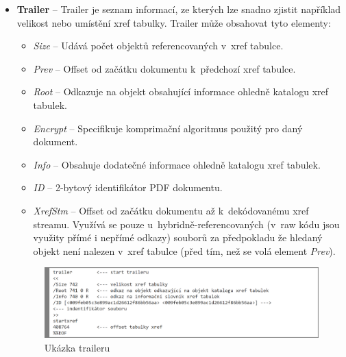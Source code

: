 \begin{itemize}
	\item \textbf{Trailer} --  Trailer je seznam informací, ze kterých lze snadno zjistit například velikost nebo umístění xref tabulky. Trailer může obsahovat tyto elementy:
	\begin{itemize}
		\item \textit{Size} -- Udává počet objektů referencovaných v~xref tabulce. 
		\item \textit{Prev} -- Offset od začátku dokumentu k~předchozí xref tabulce.
		\item \textit{Root} -- Odkazuje na objekt obsahující informace ohledně katalogu xref tabulek.
		\item \textit{Encrypt} -- Specifikuje komprimační algoritmus použitý pro daný dokument.
		\item \textit{Info} -- Obsahuje dodatečné informace ohledně katalogu xref tabulek.
		\item \textit{ID} -- 2-bytový identifikátor PDF dokumentu.
		\item \textit{XrefStm} -- Offset od začátku dokumentu až k~dekódovanému xref streamu. Využívá se pouze u~hybridně-referencovaných (v~raw kódu jsou využity přímé i nepřímé odkazy) souborů za předpokladu že hledaný objekt není nalezen v~xref tabulce (před tím, než se volá element \textit{Prev}). 
	\end{itemize}
	\begin{figure}[h!]
	\centering
	\includegraphics[width=15cm]{img/pdf_trailer}
	\caption{Ukázka traileru}
	\label{fig:pdf_trailer}
	\end{figure}
\end{itemize}
